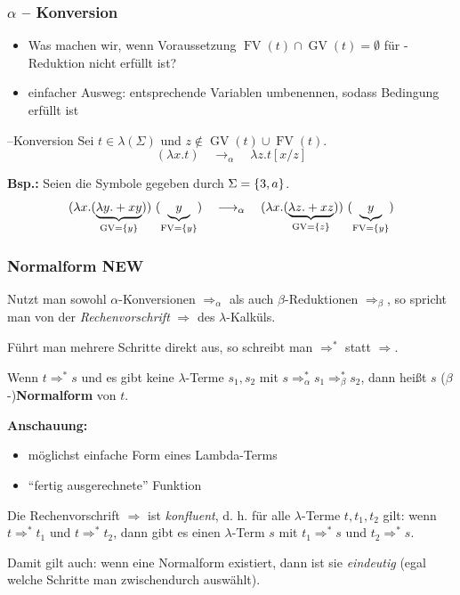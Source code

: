\documentclass{beamer}
\DeclareMathOperator{\GV}{GV}
\DeclareMathOperator{\FV}{FV}
\begin{document}
\begin{frame} \frametitle{$\alpha$ -- Konversion }
	\footnotesize
	\begin{itemize}
		\item Was machen wir, wenn Voraussetzung $\FV(t) \cap \GV(t) = \emptyset$ für \textbeta-Reduktion nicht erfüllt ist?
		\item einfacher Ausweg: entsprechende Variablen umbenennen, sodass Bedingung erfüllt ist
	\end{itemize}

	\pause
	
	\begin{block}{\textalpha --Konversion}
		Sei $t \in \lambda(\Sigma)$ und $z \notin \GV(t) \cup \FV(t)$.
		\begin{equation*}
			(\lambda x . t) \quad \longrightarrow_\alpha \quad \lambda z . t[x / z]
		\end{equation*}
	\end{block}

	\pause
	
	\textbf{Bsp.:} Seien die Symbole gegeben durch $\Sigma = \left\{ 3,a \right\}$.
	\begin{equation*}
		(\lambda x . (\underbrace{\lambda y . + x y}_{\GV = \menge{y}})) \ (\underbrace{y}_{\FV = \menge{y}}) 
		\quad \longrightarrow_\alpha \quad 
		(\lambda x . (\underbrace{\lambda z . + x z}_{\GV = \menge{z}})) \ (\underbrace{y}_{\FV = \menge{y}})
	\end{equation*}
\end{frame}

\begin{frame} \frametitle{Normalform \hfill \alert{\small NEW}}
	\footnotesize \justifying
	Nutzt man sowohl $\alpha$-Konversionen $\Rightarrow_\alpha$ als auch $\beta$-Reduktionen $\Rightarrow_\beta$, so spricht man von der \textit{Rechenvorschrift} $\Rightarrow$ des $\lambda$-Kalküls.
	
	Führt man mehrere Schritte direkt aus, so schreibt man $\Rightarrow^\ast$ statt $\Rightarrow$.
	\pause
	
	Wenn $t \Rightarrow^\ast s$ und es gibt keine $\lambda$-Terme $s_1, s_2$ mit $s \Rightarrow_\alpha^\ast s_1 \Rightarrow_\beta^\ast s_2$, dann heißt $s$ ($\beta$-)\textbf{Normalform} von $t$.
	
	\textbf{Anschauung:} \vspace{-.7\baselineskip}
	\begin{itemize}
		\item möglichst einfache Form eines Lambda-Terms
		\item \enquote{fertig ausgerechnete} Funktion
	\end{itemize}
	\pause
	
	Die Rechenvorschrift $\Rightarrow$ ist \textit{konfluent}, d. h. für alle $\lambda$-Terme $t, t_1 , t_2$ gilt: wenn $t \Rightarrow^\ast t_1$ und $t \Rightarrow^\ast t_2$, dann gibt es einen $\lambda$-Term $s$ mit $t_1 \Rightarrow^\ast s$ und $t_2 \Rightarrow^\ast s$.
	
	Damit gilt auch: wenn eine Normalform existiert, dann ist sie \textit{eindeutig} (egal welche Schritte man zwischendurch auswählt).
\end{frame}
\end{document}
